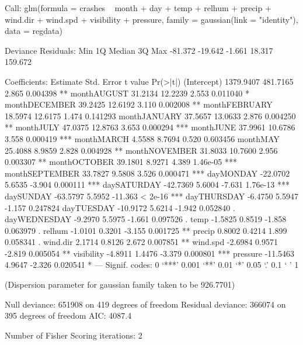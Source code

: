 \documentclass[11pt, a4paper]{article}
\begin{document}
\begin{Schunk}
\begin{Soutput}
Call:
glm(formula = crashes ~ month + day + temp + relhum + precip + 
    wind.dir + wind.spd + visibility + pressure, family = gaussian(link = "identity"), 
    data = regdata)

Deviance Residuals: 
    Min       1Q   Median       3Q      Max  
-81.372  -19.642   -1.661   18.317  159.672  

Coefficients:
                Estimate Std. Error t value Pr(>|t|)    
(Intercept)    1379.9407   481.7165   2.865 0.004398 ** 
monthAUGUST      31.2134    12.2239   2.553 0.011040 *  
monthDECEMBER    39.2425    12.6192   3.110 0.002008 ** 
monthFEBRUARY    18.5974    12.6175   1.474 0.141293    
monthJANUARY     37.5657    13.0633   2.876 0.004250 ** 
monthJULY        47.0375    12.8763   3.653 0.000294 ***
monthJUNE        37.9961    10.6786   3.558 0.000419 ***
monthMARCH        4.5588     8.7694   0.520 0.603456    
monthMAY         25.4088     8.9859   2.828 0.004928 ** 
monthNOVEMBER    31.8033    10.7600   2.956 0.003307 ** 
monthOCTOBER     39.1801     8.9271   4.389 1.46e-05 ***
monthSEPTEMBER   33.7827     9.5808   3.526 0.000471 ***
dayMONDAY       -22.0702     5.6535  -3.904 0.000111 ***
daySATURDAY     -42.7369     5.6004  -7.631 1.76e-13 ***
daySUNDAY       -63.5797     5.5952 -11.363  < 2e-16 ***
dayTHURSDAY      -6.4750     5.5947  -1.157 0.247824    
dayTUESDAY      -10.9172     5.6214  -1.942 0.052840 .  
dayWEDNESDAY     -9.2970     5.5975  -1.661 0.097526 .  
temp             -1.5825     0.8519  -1.858 0.063979 .  
relhum           -1.0101     0.3201  -3.155 0.001725 ** 
precip            0.8002     0.4214   1.899 0.058341 .  
wind.dir          2.1714     0.8126   2.672 0.007851 ** 
wind.spd         -2.6984     0.9571  -2.819 0.005054 ** 
visibility       -4.8911     1.4476  -3.379 0.000801 ***
pressure        -11.5463     4.9647  -2.326 0.020541 *  
---
Signif. codes:  0 ‘***’ 0.001 ‘**’ 0.01 ‘*’ 0.05 ‘.’ 0.1 ‘ ’ 1

(Dispersion parameter for gaussian family taken to be 926.7701)

    Null deviance: 651908  on 419  degrees of freedom
Residual deviance: 366074  on 395  degrees of freedom
AIC: 4087.4

Number of Fisher Scoring iterations: 2
\end{Soutput}
\end{Schunk}
\end{document}
